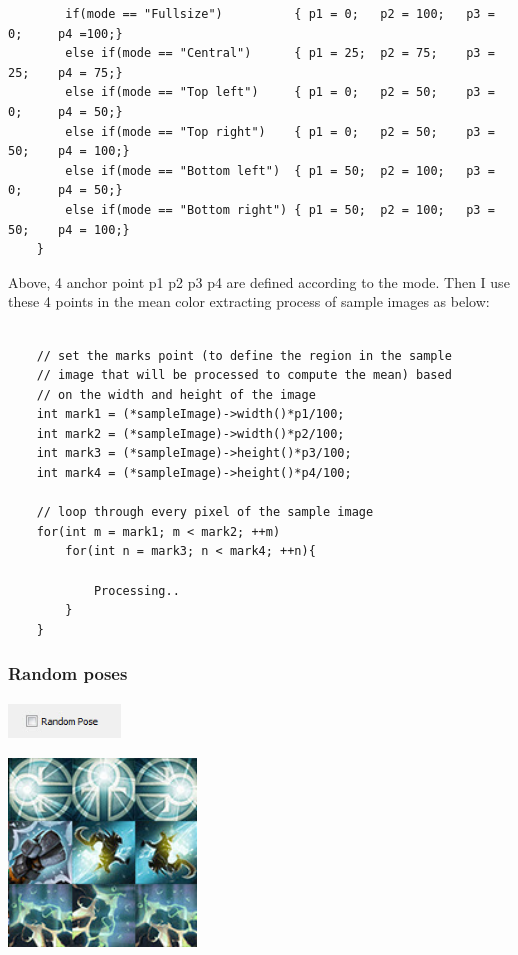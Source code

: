 \documentclass[english]{article}
\begin{document}
{\begin{lstlisting}
		if(mode == "Fullsize")          { p1 = 0;   p2 = 100;   p3 = 0;     p4 =100;}
		else if(mode == "Central")      { p1 = 25;  p2 = 75;    p3 = 25;    p4 = 75;}
		else if(mode == "Top left")     { p1 = 0;   p2 = 50;    p3 = 0;     p4 = 50;}
		else if(mode == "Top right")    { p1 = 0;   p2 = 50;    p3 = 50;    p4 = 100;}
		else if(mode == "Bottom left")  { p1 = 50;  p2 = 100;   p3 = 0;     p4 = 50;}
		else if(mode == "Bottom right") { p1 = 50;  p2 = 100;   p3 = 50;    p4 = 100;}
	}
\end{lstlisting}

Above, 4 anchor point p1 p2 p3 p4 are defined according to the mode. Then I use these 4 points in the mean color extracting process of sample images as below:

\lstset{language=C++}
\begin{lstlisting}

	// set the marks point (to define the region in the sample
	// image that will be processed to compute the mean) based
	// on the width and height of the image
	int mark1 = (*sampleImage)->width()*p1/100;
	int mark2 = (*sampleImage)->width()*p2/100;
	int mark3 = (*sampleImage)->height()*p3/100;
	int mark4 = (*sampleImage)->height()*p4/100;
	
	// loop through every pixel of the sample image
	for(int m = mark1; m < mark2; ++m)
		for(int n = mark3; n < mark4; ++n){
		
			Processing..
		}
	}
\end{lstlisting}



\subsubsection{Random poses}

\begin{center}
	\includegraphics[width=3cm,height=1cm]{img/random_ui.jpg}	
\end{center} 


\begin{center}
	\includegraphics[width=5cm,height=5cm]{img/random.jpg}	
\end{center}  


}
\end{document}

